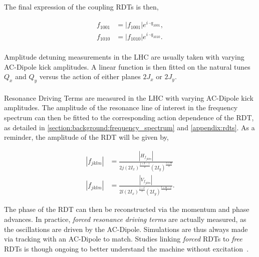 The final expression of the coupling RDTs is then,

\begin{equation}
    \begin{aligned}
        f_{1001} &= |f_{1001}|e^{i\cdot q_{1001}},\\
        f_{1010} &= |f_{1010}|e^{i\cdot q_{1010}}.
    \end{aligned}
\end{equation}


\paragraph{}
Amplitude detuning measurements in the LHC are usually taken with varying AC-Dipole kick amplitudes.
A linear function is then fitted on the natural tunes $Q_x$ and $Q_y$ versus the action of either
planes $2J_x$ or $2J_y$.


\paragraph{}
Resonance Driving Terms are measured in the LHC with varying AC-Dipole kick amplitudes. The
amplitude of the resonance line of interest in the frequency spectrum can then be fitted to the
corresponding action dependence of the RDT, as detailed in
\cref{section:background:frequency_spectrum} and \ref{appendix:rdts}. As a reminder, the amplitude
of the RDT will be given by,

\begin{equation}
    \begin{aligned}
    |f_{jklm}| &= \frac{|H_{f_{jklm}}|}{2 j (2 I_x)^\frac{j+k-1}{2} (2 I_y)^\frac{l+m}{2}} \\
    |f_{jklm}| &= \frac{|V_{f_{jklm}}|}{2 l (2 I_x)^\frac{j+k}{2} (2 I_y)^\frac{l+m-1}{2}} .
    \end{aligned}
    \nonumber
\end{equation}

The phase of the RDT can then be reconstructed via the momentum and phase advances. In practice,
\textit{forced resonance driving terms} are actually measured, as the oscillations are driven by
the AC-Dipole. Simulations are thus always made via tracking with an AC-Dipole to match.
Studies linking \textit{forced} RDTs to \textit{free} RDTs is though ongoing to better understand
the machine without excitation~\cite{carlier_nonlinear_2020}.


